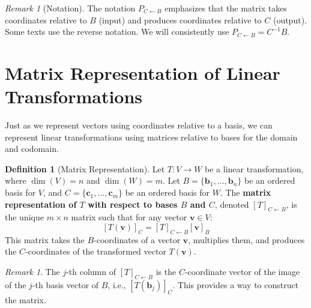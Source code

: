 \documentclass[11pt]{article}
\theoremstyle{definition}
\newtheorem{definition}[theorem]{Definition}
\theoremstyle{remark}
\newtheorem{remark}[theorem]{Remark}
\begin{document}
\begin{remark}[Notation]
The notation $P_{C \leftarrow B}$ emphasizes that the matrix takes coordinates relative to $B$ (input) and produces coordinates relative to $C$ (output). Some texts use the reverse notation. We will consistently use $P_{C \leftarrow B} = C^{-1}B$.
\end{remark}

\section{Matrix Representation of Linear Transformations}

Just as we represent vectors using coordinates relative to a basis, we can represent linear transformations using matrices relative to bases for the domain and codomain.

\begin{definition}[Matrix Representation]
Let $T: V \to W$ be a linear transformation, where $\dim(V)=n$ and $\dim(W)=m$. Let $B = \{\mathbf{b}_1, \dots, \mathbf{b}_n\}$ be an ordered basis for $V$, and $C = \{\mathbf{c}_1, \dots, \mathbf{c}_m\}$ be an ordered basis for $W$.
The \textbf{matrix representation of $T$ with respect to bases $B$ and $C$}, denoted $[T]_{C \leftarrow B}$, is the unique $m \times n$ matrix such that for any vector $\mathbf{v} \in V$:
\[ [T(\mathbf{v})]_C = [T]_{C \leftarrow B} [\mathbf{v}]_B \]
This matrix takes the $B$-coordinates of a vector $\mathbf{v}$, multiplies them, and produces the $C$-coordinates of the transformed vector $T(\mathbf{v})$.
\end{definition}

\begin{remark}
The $j$-th column of $[T]_{C \leftarrow B}$ is the $C$-coordinate vector of the image of the $j$-th basis vector of $B$, i.e., $[T(\mathbf{b}_j)]_C$. This provides a way to construct the matrix.
\end{remark}
\end{document}

